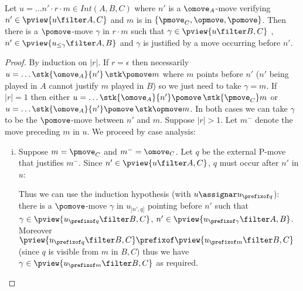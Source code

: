 \begin{lemma}
\label{lem:middlepomove}
Let $u = \ldots n' \cdot r \cdot m \in Int(A,B,C)$ where
$n'$ is a $\omove_A$-move verifying $n' \in \pview{u\filter A,C}$ and $m$ is in $\{ \pmove_C, \opmove, \pomove \}$. Then there is a $\pomove$-move $\gamma$ in $r \cdot m$ such that $\gamma \in \pview{u\filter B,C}$ , $n' \in \pview{u_{\leq \gamma} \filter A,B}$ and $\gamma$ is justified by a move occurring before $n'$.
\end{lemma}
\begin{proof}
By induction on $|r|$.
If $r=\epsilon$ then necessarily $u = \ldots \stk{\omove_A}{n'} \thinspace\stk \pomove m$ where $m$ points before $n'$ ($n'$ being played in $A$ cannot justify $m$ played in $B$) so we just need to take $\gamma = m$.
If $|r|=1$ then either
$u = \ldots \stk{\omove_A}{n'} \pomove\thinspace\stk {\pmove_C} m$
or $u = \ldots \stk{\omove_A}{n'} \pomove\thinspace\stk \opmove m$.
In both cases we can take $\gamma$ to be the $\pomove$-move between $n'$ and $m$.
Suppose $|r|>1$. Let $m^-$ denote the move preceding $m$ in $u$.
We proceed by case analysis:
\begin{enumerate}[i.]
\item Suppose $m = \pmove_C$ and $m^- = \omove_C$.
Let $q$ be the external P-move that justifies $m^-$.
Since $n' \in \pview{u\filter A,C}$, $q$ must occur after $n'$ in $u$:
\begin{center}
\end{center}

Thus we can use the induction hypothesis (with $u\assignar u_{\prefixof q}$): there is a $\pomove$-move $\gamma$
in $u_{]n',q]}$ pointing before $n'$ such that $\gamma \in \pview{u_{\prefixof q} \filter B,C}$, $n' \in \pview{u_{\prefixof \gamma} \filter A,B}$.
Moreover $\pview{u_{\prefixof q} \filter B,C} \prefixof \pview{u_{\prefixof m} \filter B,C}$ (since $q$ is visible from $m$ in $B,C$) thus we have $\gamma \in \pview{u_{\prefixof m} \filter B,C}$ as required.


\end{enumerate}
\end{proof}
